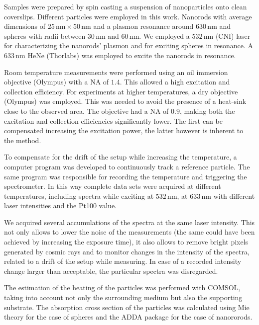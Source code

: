\documentclass[journal=nalefd,manuscript=letter]{achemso}
\newcommand{\nm}{\ensuremath{\,\textrm{nm}}}
\begin{document}
Samples were prepared by spin casting a suspension of nanoparticles onto clean
coverslips. Different particles were employed in this work. Nanorods with 
average dimensions of $25\nm\times50\nm$ and a plasmon resonance around $630\nm$
and spheres with radii between $30\nm$ and $60\nm$. We employed a $532\nm$ (CNI)
laser for characterizing the nanorods' plasmon and for exciting spheres in
resonance. A $633\nm$ HeNe (Thorlabs) was employed to excite the nanorods in
resonance. 

Room temperature measurements were performed using an oil immersion objective
(Olympus) with a NA of $1.4$. This allowed a high excitation and collection
efficiency. For experiments at higher temperatures, a dry objective (Olympus)
was employed. This was needed to avoid the presence of a heat-sink close to the
observed area. The objective had a NA of $0.9$, making both the excitation and
collection efficiencies significantly lower. The first can be compensated
increasing the excitation power, the latter however is inherent to the method. 

To compensate for the drift of the setup while increasing the temperature, a
computer program was developed to continuously track a reference particle. The
same program was responsible for recording the temperature and triggering the
spectrometer. In this way complete data sets were acquired at different
temperatures, including spectra while exciting at $532\nm$, at $633\nm$ with
different laser intensities and the Pt100 value. 

We acquired several accumulations of the spectra at the same laser intensity.
This not only allows to lower the noise of the measurements (the same could
have been achieved by increasing the exposure time), it also allows to remove
bright pixels generated by cosmic rays and to monitor changes in the intensity
of the spectra, related to a drift of the setup while measuring. In case of a
recorded intensity change larger than acceptable, the particular spectra was
disregarded.

The estimation of the heating of the particles was performed with COMSOL, taking
into account not only the surrounding medium but also the supporting substrate.
The absorption cross section of the particles was calculated using Mie theory
for the case of spheres and the ADDA package for the case of nanororods. 
\end{document}
